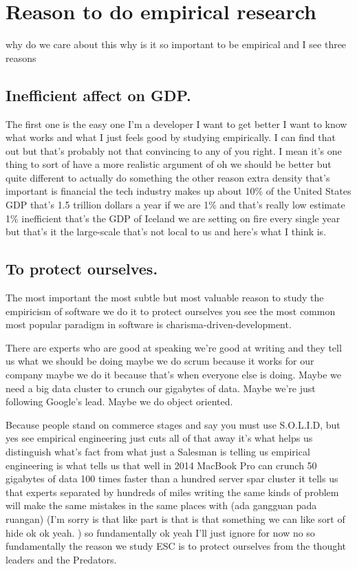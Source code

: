 \documentclass[14pt]{extreport}
\begin{document}
\chapter{Reason to do empirical research} %
why do we care about this why is it so important to be empirical and I see three reasons
  \section{Inefficient affect on GDP.}
The first one is the easy one I'm a
developer I want to get better I want to
know what works and what I just feels
good by studying empirically.
I can find that out but that's probably not that convincing to any of you right.
I mean it's one thing to sort of have a more realistic argument of oh we should be better but quite different to actually do something the other reason extra density that's
important is financial the tech industry makes up about 10\% of the United States GDP that's 1.5 trillion dollars a year
if we are 1\% and that's really low estimate 1\% inefficient that's the GDP of Iceland we are setting on fire every single year but that's it the large-scale that's not local to us and here's what I think is.
  \section{To protect ourselves.}
The most important the most subtle but most valuable reason to study the empiricism of software we do it to protect
ourselves you see the most common most popular paradigm in software is charisma-driven-development.
\par
There are experts who are good at speaking we're good at writing and they tell us what we should be doing maybe we do scrum because it works for our company maybe we do it
because that's when everyone else is doing. 
Maybe we need a big data cluster to crunch our gigabytes of data.
Maybe we're just following Google's lead.
Maybe we do object oriented. \par
Because people stand on commerce stages and say you must use S.O.L.I.D, but yes see empirical engineering just cuts all of that away it's what helps us distinguish
what's fact from what just a Salesman is
telling us empirical engineering is what
tells us that well in 2014 MacBook Pro can crunch 50 gigabytes of data 100
times faster than a hundred server spar
cluster it tells us that experts separated by hundreds of miles writing the same kinds of problem will make the same mistakes in the same places with (ada gangguan pada ruangan)
(I'm sorry is that like part is that is that something we can like sort of hide ok ok yeah. )
so fundamentally ok yeah I'll just ignore for now no so fundamentally the reason we study ESC is to protect ourselves from the thought leaders and the Predators.
\end{document}
